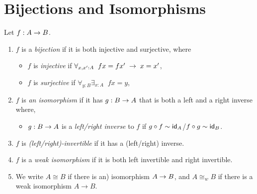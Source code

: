 

\section{Bijections and Isomorphisms}

\begin{defn} \label{defn:isos}
Let $f:A\ra B$.
\begin{enumerate}
\item $f$ is a {\em bijection} if it is both injective and surjective, where
\begin{itemize}
\item $f$ is {\em injective} if $\forall_{x,x':A}\; \; fx=fx'\;\ra\; x=x'$,
\item $f$ is {\em surjective} if $\forall_{y:B}\exists_{x:A}\;\; fx=y$,
\end{itemize}
\item $f$ is {\em an isomorphism} if it has $g:B\ra A$ that is both a left and a right
inverse where,
\begin{itemize} \item $g:B\ra A$ is a {\em left/right inverse} to $f$ if 
$g\circ f\sim \idfunc[A]$/$f\circ g\sim \idfunc[B]$.
\end{itemize}
\item $f$ is {\em (left/right)-invertible} if it has a (left/right) inverse.
\item $f$ is a {\em weak isomorphism} if it is both left invertible and right invertible.
\item We write $A\cong B$ if there is an) isomorphism $A\ra B$, and $A\cong_w B$ if there is a weak isomorphism $A\to B$.
\end{enumerate}
\end{defn}


